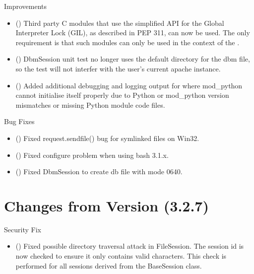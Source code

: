   Improvements

  \begin{itemize}
    \item
      ()
      Third party C modules that use the simplified API for the Global
      Interpreter Lock (GIL), as described in PEP 311, can now be used. The
      only requirement is that such modules can only be used in the context
      of the .
    \item
      ()
      DbmSession unit test no longer uses the default directory for the dbm file,
      so the test will not interfer with the user's current apache instance.
    \item
      ()
      Added additional debugging and logging output for where mod_python
      cannot initialise itself properly due to Python or mod_python version
      mismatches or missing Python module code files.
  \end{itemize}

  Bug Fixes

  \begin{itemize}
    \item
      ()
      Fixed request.sendfile() bug for symlinked files on Win32.
    \item
      ()
      Fixed configure problem when using bash 3.1.x.
    \item
      ()
      Fixed DbmSession to create db file with mode 0640.
  \end{itemize}
 
\chapter{Changes from Version (3.2.7)\label{app-changes-from-3.2.7}}


  Security Fix 

  \begin{itemize}
    \item
    ()
    Fixed possible directory traversal attack in FileSession. The session
    id is now checked to ensure it only contains valid characters. This
    check is performed for all sessions derived from the BaseSession 
    class. 
  \end{itemize}

